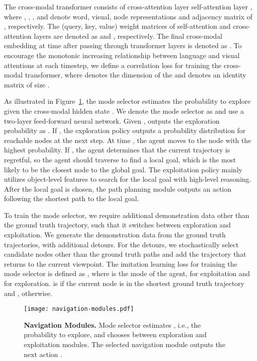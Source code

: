 \documentclass[10pt,twocolumn,letterpaper]{article}
\begin{document}
The cross-modal transformer consists of cross-attention layer  \scalebox{0.9}{} self-attention layer \scalebox{0.9}{} \scalebox{0.9}{}
\scalebox{0.9}{}, where , , , and  denote word, visual, node representations and adjacency matrix of , respectively. The (query, key, value) weight matrices of self-attention and cross-attention layers are denoted as \scalebox{0.9}{} and \scalebox{0.9}{}, respectively. The final cross-modal embedding at time  after passing through  transformer layers is denoted as .
To encourage the monotonic increasing relationship between language and visual attentions at each timestep, we define a correlation loss \scalebox{0.9}{} for training the cross-modal transformer, where  denotes the dimension of the  and  denotes an identity matrix of size . 

As illustrated in Figure~\ref{fig:navigation-modules}, the mode selector estimates the probability to explore  given the cross-modal hidden state . We denote the mode selector as  and use a two-layer feed-forward neural network. Given ,  outputs the exploration probability as .
If , the exploration policy outputs a probability distribution for reachable nodes at the next step. At time , the agent moves to the node with the highest probability. If , the agent determines that the current trajectory is regretful, so the agent should traverse to find a local goal, which is the most likely to be the closest node to the global goal. The exploitation policy mainly utilizes object-level features to search for the local goal with high-level reasoning. After the local goal is chosen, the path planning module outputs an action following the shortest path to the local goal.

To train the mode selector, we require additional demonstration data
other than the ground truth trajectory, such that it switches between exploration and exploitation.
We generate the demonstration data from the ground truth trajectories, with additional detours.
For the detours, we stochastically select candidate nodes other than the ground truth paths
and add the trajectory that returns to the current viewpoint.
The imitation learning loss for training the mode selector is defined as \scalebox{0.9}{},
where  is the mode of the agent,  for exploitation and  for exploration.  is  if the current node is in the shortest ground truth trajectory and , otherwise.
\begin{figure}[t!]{\centering\texttt{[image: navigation-modules.pdf]}}\centering
\vspace{-0.3cm}
\caption{\protect\renewcommand{\baselinestretch}{0.9}\protect\small{\protect\textbf{Navigation Modules.} 
Mode selector estimates , i.e., the probability to explore, and chooses between exploration and exploitation modules. The selected navigation module outputs the next action .
}}\label{fig:navigation-modules}\vspace{-0.7cm}
\end{figure}
\vspace{-0.3cm}
\end{document}
